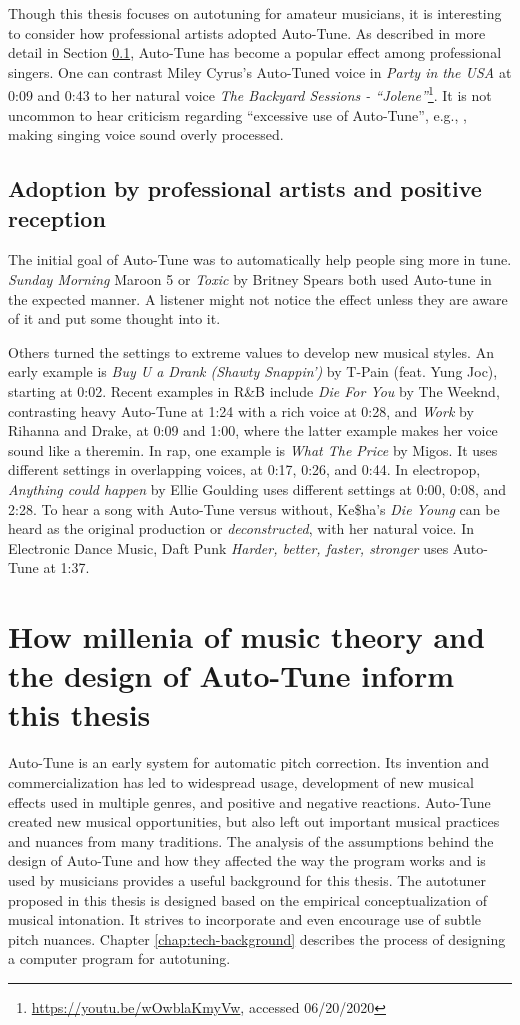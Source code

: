Though this thesis focuses on autotuning for amateur musicians, it is interesting to consider how professional artists adopted Auto-Tune. As described in more detail in Section \ref{sec:professional}, Auto-Tune has become a popular effect among professional singers. One can contrast Miley Cyrus's Auto-Tuned voice in \textit{Party in the USA} at 0:09 and 0:43 to her natural voice \textit{The Backyard Sessions - ``Jolene''}\footnote{\url{https://youtu.be/wOwblaKmyVw}, accessed 06/20/2020}. It is not uncommon to hear criticism regarding ``excessive use of Auto-Tune'', e.g., \cite{katz2014}, making singing voice sound overly processed. 

\subsection{Adoption by professional artists and positive reception}
\label{sec:professional}
The initial goal of Auto-Tune was to automatically help people sing more in tune. \textit{Sunday Morning} Maroon 5 or \textit{Toxic} by Britney Spears both used Auto-tune in the expected manner. A listener might not notice the effect unless they are aware of it and put some thought into it.

Others turned the settings to extreme values to develop new musical styles. An early example is \textit{Buy U a Drank (Shawty Snappin')} by T-Pain (feat. Yung Joc), starting at 0:02. Recent examples in R\&B include \textit{Die For You} by The Weeknd, contrasting heavy Auto-Tune at 1:24 with a rich voice at 0:28, and \textit{Work} by Rihanna and Drake, at 0:09 and 1:00, where the latter example makes her voice sound like a theremin. In rap, one example is \textit{What The Price} by Migos. It uses different settings in overlapping voices, at 0:17, 0:26, and 0:44. In electropop, \textit{Anything could happen} by Ellie Goulding uses different settings at 0:00, 0:08, and 2:28. To hear a song with Auto-Tune versus without, Ke\$ha's \textit{Die Young} can be heard as the original production or \textit{deconstructed}, with her natural voice. In Electronic Dance Music, Daft Punk \textit{Harder, better, faster, stronger} uses Auto-Tune at 1:37. 

\section{How millenia of music theory and the design of Auto-Tune inform this thesis}
Auto-Tune is an early system for automatic pitch correction. Its invention and commercialization has led to widespread usage, development of new musical effects used in multiple genres, and positive and negative reactions. Auto-Tune created new musical opportunities, but also left out important musical practices and nuances from many traditions. The analysis of the assumptions behind the design of Auto-Tune and how they affected the way the program works and is used by musicians provides a useful background for this thesis. The autotuner proposed in this thesis is designed based on the empirical conceptualization of musical intonation. It strives to incorporate and even encourage use of subtle pitch nuances. Chapter \ref{chap:tech-background} describes the process of designing a computer program for autotuning.

